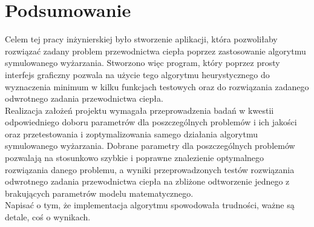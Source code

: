 \documentclass[twoside]{projektInzynierskiMS1}
\newcommand{\si}{ś}
\begin{document}
\section{Podsumowanie}
Celem tej pracy inżynierskiej było stworzenie aplikacji, która pozwoliłaby rozwiązać zadany problem przewodnictwa ciepła poprzez zastosowanie algorytmu symulowanego wyżarzania. Stworzono więc program, który poprzez prosty interfejs graficzny pozwala na użycie tego algorytmu heurystycznego do wyznaczenia minimum w kilku funkcjach testowych oraz do rozwiązania zadanego odwrotnego zadania przewodnictwa ciepła. \\

Realizacja założeń projektu wymagała przeprowadzenia badań w kwestii odpowiedniego doboru parametrów dla poszczególnych problemów i ich jako\si ci oraz przetestowania i zoptymalizowania samego działania algorytmu symulowanego wyżarzania. Dobrane parametry dla poszczególnych problemów pozwalają na stosunkowo szybkie i poprawne znalezienie optymalnego rozwiązania danego problemu, a wyniki przeprowadzonych testów rozwiązania odwrotnego zadania przewodnictwa ciepła na zbliżone odtworzenie jednego z brakujących parametrów modelu matematycznego. \\

%
Napisać o tym, że implementacja algorytmu spowodowała trudno\si ci, ważne są detale, coś o wynikach.
%
\end{document}
